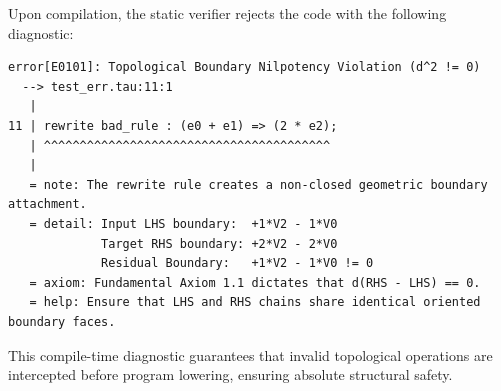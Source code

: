 Upon compilation, the \ToposLang{} static verifier rejects the code with the following diagnostic:

\begin{lstlisting}[language={}, caption={Diagnostic Error Emitted by the \ToposLang{} Compiler.}]
error[E0101]: Topological Boundary Nilpotency Violation (d^2 != 0)
  --> test_err.tau:11:1
   |
11 | rewrite bad_rule : (e0 + e1) => (2 * e2);
   | ^^^^^^^^^^^^^^^^^^^^^^^^^^^^^^^^^^^^^^^^
   |
   = note: The rewrite rule creates a non-closed geometric boundary attachment.
   = detail: Input LHS boundary:  +1*V2 - 1*V0
             Target RHS boundary: +2*V2 - 2*V0
             Residual Boundary:   +1*V2 - 1*V0 != 0
   = axiom: Fundamental Axiom 1.1 dictates that d(RHS - LHS) == 0.
   = help: Ensure that LHS and RHS chains share identical oriented boundary faces.
\end{lstlisting}

This compile-time diagnostic guarantees that invalid topological operations are intercepted before program lowering, ensuring absolute structural safety.

